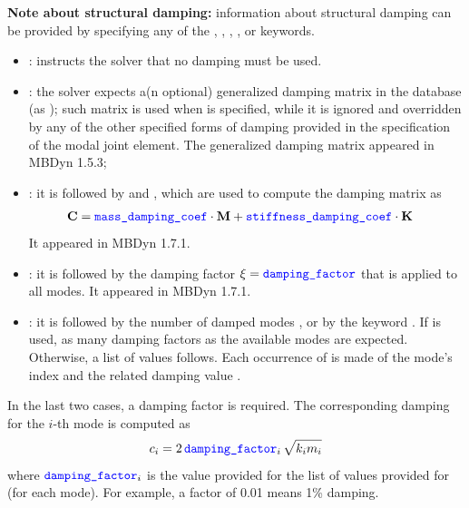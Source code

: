 \textbf{Note about structural damping:}
information about structural damping can be provided by specifying any of the
, , ,
, or  keywords.
\begin{itemize}
\item
{}:
instructs the solver that no damping must be used.

\item
{}:
the solver expects a(n optional) generalized damping matrix in the database
(as );
such matrix is used when  is specified,
while it is ignored and overridden by any of the other specified forms
of damping provided in the specification of the modal joint element.
The generalized damping matrix appeared in MBDyn 1.5.3;

\item
{}:
it is followed by
 and ,
which are used to compute the damping matrix as
\begin{align}
	\bm{\mathbf C} &= \textcolor{blue}{\texttt{mass\_damping\_coef}} \cdot \bm{\mathbf M} + \textcolor{blue}{\texttt{stiffness\_damping\_coef}} \cdot \bm{\mathbf K}
\end{align}
It appeared in MBDyn 1.7.1.

\item
{}:
it is followed by the damping factor $\xi = \textcolor{blue}{\texttt{damping\_factor}}$
that is applied to all modes.
It appeared in MBDyn 1.7.1.

\item
{}:
it is followed by the number of damped modes ,
or by the keyword .
If  is used, as many damping factors as the available modes
are expected.
Otherwise, a list of  values follows.
Each occurrence of  is made of the mode's index 
and the related damping value .
\end{itemize}

In the last two cases, a damping factor is required.
The corresponding damping for the $i$-th mode is computed as
\begin{displaymath}
	c_i = 2 \, \textcolor{blue}{\texttt{damping\_factor}}_i \, \sqrt{k_i m_i}
\end{displaymath}
where $\textcolor{blue}{\texttt{damping\_factor}}_i$ is the value provided for the list 
of values provided for  (for each mode).
For example, a factor of 0.01 means 1\% damping.

